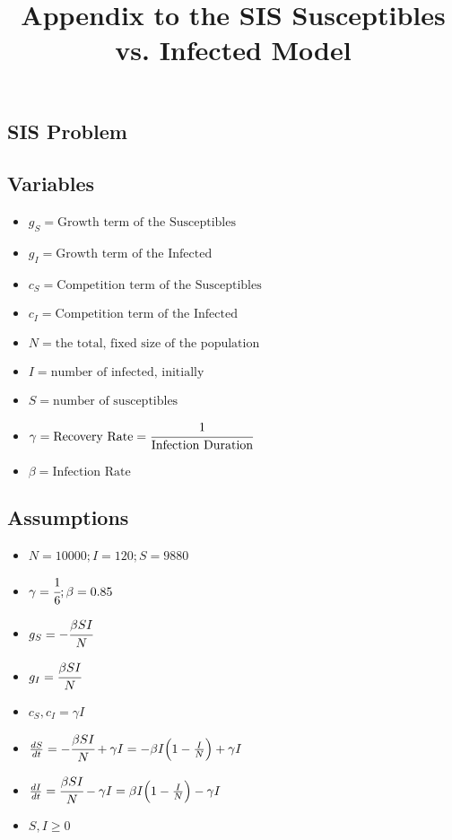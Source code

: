 \documentclass[11pt]{article}
\title{Appendix to the SIS Susceptibles vs. Infected Model}
\begin{document}
    
    
    \maketitle
    
    

    
    \hypertarget{sis-problem}{%
\subsection{SIS Problem}\label{sis-problem}}

    \hypertarget{variables}{%
\subsection{Variables}\label{variables}}

\begin{itemize}
\item
  \(g_S = \text{Growth term of the Susceptibles}\)
\item
  \(g_I = \text{Growth term of the Infected}\)
\item
  \(c_S = \text{Competition term of the Susceptibles}\)
\item
  \(c_I = \text{Competition term of the Infected}\)
\item
  \(N = \text{the total, fixed size of the population}\)
\item
  \(I = \text{number of infected, initially}\)
\item
  \(S = \text{number of susceptibles}\)
\item
  \(\gamma = \text{Recovery Rate} = \cfrac{1}{\text{Infection Duration}}\)
\item
  \(\beta = \text{Infection Rate}\)
\end{itemize}

\hypertarget{assumptions}{%
\subsection{Assumptions}\label{assumptions}}

\begin{itemize}
\item
  \(N = 10000; I = 120; S = 9880\)
\item
  \(\gamma = \cfrac{1}{6}; \beta = 0.85\)
\item
  \(g_S = -\cfrac{\beta S I}{N}\)
\item
  \(g_I = \cfrac{\beta S I}{N}\)
\item
  \(c_S, c_I = \gamma I\)
\item
  \(\frac{dS}{dt} = -\cfrac{\beta S I}{N} + \gamma I = -\beta I \Big(1 - \frac{I}{N}\Big) + \gamma I\)
\item
  \(\frac{dI}{dt} = \cfrac{\beta S I}{N} - \gamma I = \beta I \Big(1 - \frac{I}{N}\Big) - \gamma I\)
\item
  \(S, I \geq 0\)
\end{itemize}
\end{document}
